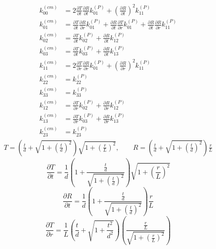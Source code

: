 \documentclass[10pt,letterpaper]{article}
\begin{document}
\begin{align}
k^{(cm)}_{00} &= 2 \frac{\partial T}{\partial t} \frac{\partial R}{\partial t} k^{(P)}_{01} + \left(\frac{\partial R}{\partial t}\right)^2 k^{(P)}_{11}\nonumber\\
k^{(cm)}_{01} &=\frac{\partial T}{\partial t} \frac{\partial R}{\partial r} k^{(P)}_{01}+\frac{\partial R}{\partial t} \frac{\partial T}{\partial r} k^{(P)}_{01}+\frac{\partial R}{\partial t} \frac{\partial R}{\partial r} k^{(P)}_{11} \nonumber\\
k^{(cm)}_{02} &= \frac{\partial T}{\partial t} k^{(P)}_{02}+\frac{\partial R}{\partial t} k^{(P)}_{12} \nonumber\\
k^{(cm)}_{03} &= \frac{\partial T}{\partial t} k^{(P)}_{03}+\frac{\partial R}{\partial t} k^{(P)}_{13} \nonumber\\
k^{(cm)}_{11} &=2 \frac{\partial T}{\partial r} \frac{\partial R}{\partial r} k^{(P)}_{01}+\left(\frac{\partial R}{\partial r}\right)^2 k^{(P)}_{11} \nonumber\\
k^{(cm)}_{22} &= k^{(P)}_{22}\nonumber\\
k^{(cm)}_{33} &= k^{(P)}_{33}\nonumber\\
k^{(cm)}_{12} &= \frac{\partial T}{\partial r} k^{(P)}_{02}+\frac{\partial R}{\partial r} k^{(P)}_{12} \nonumber\\
k^{(cm)}_{13} &= \frac{\partial T}{\partial r} k^{(P)}_{03}+\frac{\partial R}{\partial r} k^{(P)}_{13} \nonumber\\
k^{(cm)}_{23} &= k^{(P)}_{23}
\end{align}
\begin{align}
T = \left(\frac{t}{d} + \sqrt{1+\left(\frac{t}{d}\right)^2 }\right)\sqrt{ 1+ \left(\frac{r}{L}\right)^2},\qquad R =\left(\frac{t}{d} + \sqrt{1+\left(\frac{t}{d}\right)^2 }\right)\frac{r}{L}
\end{align}
\begin{equation}
\frac{\partial T}{\partial t}=\frac{1}{d} \left( 1+ \frac{\frac{t}{d}}{\sqrt{1+\left(\frac{t}{d}\right)^2}}\right)\sqrt{1+\left(\frac{r}{L}\right)^2}
\end{equation}
\begin{equation}
\frac{\partial R}{\partial t}=\frac{1}{d} \left( 1+ \frac{\frac{t}{d}}{\sqrt{1+\left(\frac{t}{d}\right)^2}}\right)\frac{r}{L}
\end{equation}
\begin{equation}
\frac{\partial T}{\partial r}= \frac1L \left( \frac{t}{d} + \sqrt{1+ \frac{t^2}{d^2}}\right)\left( \frac{\frac{r}{L}}{\sqrt{1+\left(\frac{r}{L}\right)^2}} \right)
\end{equation}
\end{document}
